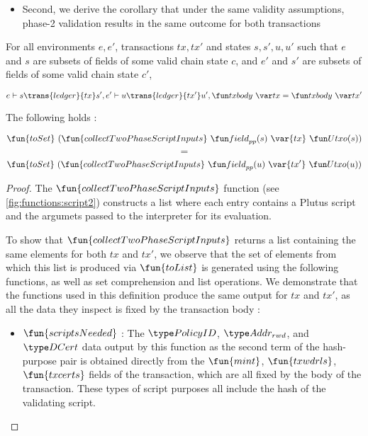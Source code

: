 \begin{property}
\begin{itemize}
  \item Second, we derive the corollary that under the same validity assumptions,
  phase-2 validation results in the same outcome for both transactions
\end{itemize}

\begin{lemma}
  \label{lem:inputs}
  For all environments $e, e'$, transactions $tx, tx'$ and states $s, s', u, u'$ such that
  $e$ and $s$ are subsets of fields of some valid chain state $c$, and
  $e'$ and $s'$ are subsets of fields of some valid chain state $c'$,

  \begin{equation*}
    e\vdash s\trans{ledger}{tx}s', \\
    e'\vdash u\trans{ledger}{tx'}u', \\
    \txbody{tx} = \txbody{tx'}
  \end{equation*}

  The following holds :

  \[\fun{toSet}~(\fun{collectTwoPhaseScriptInputs} ~\field_{pp}(s)~\var{tx}~ \Utxo(s))\]
  \[ = \]
  \[\fun{toSet}~(\fun{collectTwoPhaseScriptInputs} ~\field_{pp}(u)~\var{tx'}~ \Utxo(u))\]

\end{lemma}
\begin{proof}

    The $\fun{collectTwoPhaseScriptInputs}$
    function (see \ref{fig:functions:script2})
    constructs a list where each entry contains a Plutus script
    and the argumets passed to the interpreter for its evaluation.

    To show that $\fun{collectTwoPhaseScriptInputs}$ returns a list containing
    the same elements for both $tx$ and $tx'$, we observe that
    the set of elements from which this list is produced via $\fun{toList}$
    is generated using the following functions, as well as set comprehension
    and list operations.
    We demonstrate that the functions used in this definition
    produce the same output for $tx$ and $tx'$, as all the data they
    inspect is fixed by the transaction body :

    \begin{itemize}
      \item $\fun{scriptsNeeded}$ : The $\PolicyID$, $\AddrRWD$, and $\DCert$ data
      output by this function as the second term of the hash-purpose pair
      is obtained directly from the $\fun{mint}$, $\fun{txwdrls}$,
      $\fun{txcerts}$ fields of the transaction, which are all fixed by the
      body of the transaction. These types of script purposes all include
      the hash of the validating script.


\end{itemize}
\end{proof}
\end{property}
